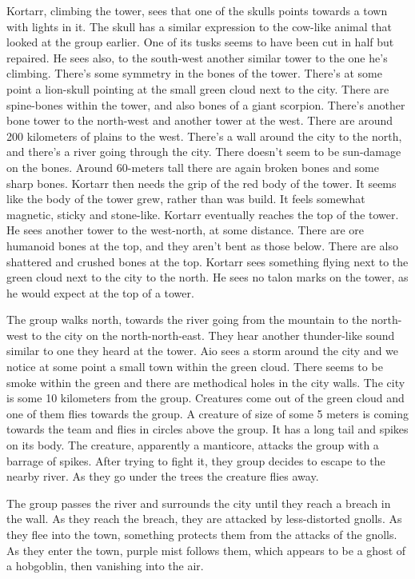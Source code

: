 \documentclass[10pt,a4paper,twoside,openany,hidelinks]{book}
\begin{document}
Kortarr, climbing the tower, sees that one of the skulls points towards a town with lights in it. The skull has a similar expression to the cow-like animal that looked at the group earlier. One of its tusks seems to have been cut in half but repaired. He sees also, to the south-west another similar tower to the one he's climbing. There's some symmetry in the bones of the tower. There's at some point a lion-skull pointing at the small green cloud next to the city. There are spine-bones within the tower, and also bones of a giant scorpion. There's another bone tower to the north-west and another tower at the west. There are around 200 kilometers of plains to the west. There's a wall around the city to the north, and there's a river going through the city.
There doesn't seem to be sun-damage on the bones. Around 60-meters tall there are again broken bones and some sharp bones. Kortarr then needs the grip of the red body of the tower. It seems like the body of the tower grew, rather than was build. It feels somewhat magnetic, sticky and stone-like. Kortarr eventually reaches the top of the tower. He sees another tower to the west-north, at some distance.
There are ore humanoid bones at the top, and they aren't bent as those below. There are also shattered and crushed bones at the top.
Kortarr sees something flying next to the green cloud next to the city to the north. He sees no talon marks on the tower, as he would expect at the top of a tower.

The group walks north, towards the river going from the mountain to the north-west to the city on the north-north-east. They hear another thunder-like sound similar to one they heard at the tower. Aio sees a storm around the city and we notice at some point a small town within the green cloud. There seems to be smoke within the green and there are methodical holes in the city walls. The city is some 10 kilometers from the group. Creatures come out of the green cloud and one of them flies towards the group. A creature of size of some 5 meters is coming towards the team and flies in circles above the group. It has a long tail and spikes on its body. 
The creature, apparently a manticore, attacks the group with a barrage of spikes. After trying to fight it, they group decides to escape to the nearby river. As they go under the trees the creature flies away.

The group passes the river and surrounds the city until they reach a breach in the wall. As they reach the breach, they are attacked by less-distorted gnolls. As they flee into the town, something protects them from the attacks of the gnolls. As they enter the town, purple mist follows them, which appears to be a ghost of a hobgoblin, then vanishing into the air.
\end{document}
